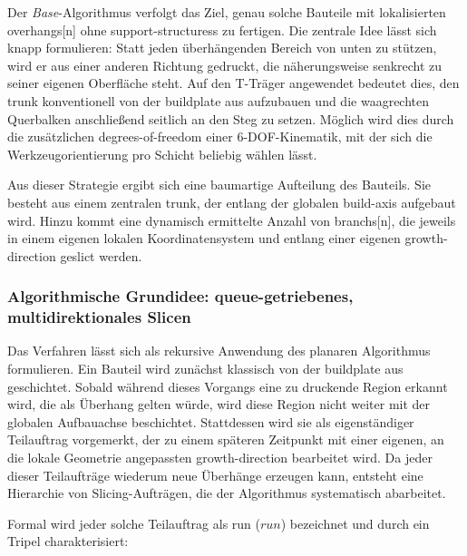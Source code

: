                 Der \emph{Base}-Algorithmus verfolgt das Ziel, genau solche Bauteile mit lokalisierten \glspl{overhang}[n] ohne \glspl{support-structures} zu fertigen.
                Die zentrale Idee lässt sich knapp formulieren:
                Statt jeden überhängenden Bereich von unten zu stützen, wird er aus einer anderen Richtung gedruckt, die näherungsweise senkrecht zu seiner eigenen Oberfläche steht.
                Auf den T-Träger angewendet bedeutet dies, den \gls{trunk} konventionell von der \gls{buildplate} aus aufzubauen und die waagrechten Querbalken anschließend seitlich an den Steg zu setzen.
                Möglich wird dies durch die zusätzlichen \gls{degrees-of-freedom} einer 6-\ac{DOF}-Kinematik, mit der sich die Werkzeugorientierung pro Schicht beliebig wählen lässt.

                Aus dieser Strategie ergibt sich eine baumartige Aufteilung des Bauteils.
                Sie besteht aus einem zentralen \gls{trunk}, der entlang der globalen \gls{build-axis} aufgebaut wird.
                Hinzu kommt eine dynamisch ermittelte Anzahl von \glspl{branch}[n], die jeweils in einem eigenen lokalen Koordinatensystem und entlang einer eigenen \gls{growth-direction} geslict werden.

            \subsubsection{Algorithmische Grundidee: queue-getriebenes, multidirektionales Slicen}\label{subsubsec:concept-base-core-idea}
                Das Verfahren lässt sich als rekursive Anwendung des planaren Algorithmus formulieren.
                Ein Bauteil wird zunächst klassisch von der \gls{buildplate} aus geschichtet.
                Sobald während dieses Vorgangs eine zu druckende Region erkannt wird, die als Überhang gelten würde, wird diese Region nicht weiter mit der globalen Aufbauachse beschichtet.
                Stattdessen wird sie als eigenständiger Teilauftrag vorgemerkt, der zu einem späteren Zeitpunkt mit einer eigenen, an die lokale Geometrie angepassten \gls{growth-direction} bearbeitet wird.
                Da jeder dieser Teilaufträge wiederum neue Überhänge erzeugen kann, entsteht eine Hierarchie von Slicing-Aufträgen, die der Algorithmus systematisch abarbeitet.

                Formal wird jeder solche Teilauftrag als \gls{run} ($\mathit{run}$) bezeichnet und durch ein Tripel charakterisiert:

